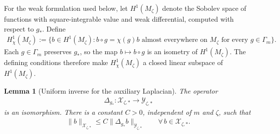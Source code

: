 \documentclass[a4paper,11pt,oneside,reqno]{amsart}
\numberwithin{equation}{section}
\newtheorem{lemma}[theorem]{Lemma}
\theoremstyle{definition}
\begin{document}
%
For the weak formulation used below, let $H^1(M_\zeta)$
denote the Sobolev space of functions with square-integrable
value and weak differential, computed with respect to $g_*$.
Define
%
\begin{align*}
    H^1_\chi(M_\zeta)
    :=\bigl\{
        b\in H^1(M_\zeta):
        b\circ g=\chi(g)b
        \text{ almost everywhere on }M_\zeta
        \text{ for every }g\in\Gamma_m
    \bigr\}.
\end{align*}
%
Each $g\in\Gamma_m$ preserves $g_*$, so the map
$b\mapsto b\circ g$ is an isometry of $H^1(M_\zeta)$.
The defining conditions therefore make
$H^1_\chi(M_\zeta)$ a closed linear subspace of
$H^1(M_\zeta)$.
%
\begin{lemma}[Uniform inverse for the auxiliary Laplacian]
    \label{lem:s4-model-inverse}
    The operator
    \begin{align*}
        \Delta_{g_*}:\mathcal X_{\zeta,*}
        \rightarrow\mathcal Y_{\zeta,*}
    \end{align*}
    is an isomorphism. There is a constant $C>0$,
    independent of $m$ and $\zeta$, such that
    \begin{align}
        \label{eq:s4-model-inverse-bound}
        \|b\|_{\mathcal X_{\zeta,*}}
        \leq C\|\Delta_{g_*}b\|_{\mathcal Y_{\zeta,*}}
        \qquad\forall\,b\in\mathcal X_{\zeta,*}.
    \end{align}
\end{lemma}
\end{document}

